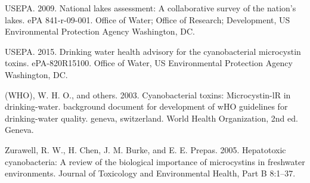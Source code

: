 \documentclass[11pt,]{article}
\begin{document}
USEPA. 2009. National lakes assessment: A collaborative survey of the
nation's lakes. ePA 841-r-09-001. Office of Water; Office of Research;
Development, US Environmental Protection Agency Washington, DC.

USEPA. 2015. Drinking water health advisory for the cyanobacterial
microcystin toxins. ePA-820R15100. Office of Water, US Environmental
Protection Agency Washington, DC.

(WHO), W. H. O., and others. 2003. Cyanobacterial toxins: Microcystin-lR
in drinking-water. background document for development of wHO guidelines
for drinking-water quality. geneva, switzerland. World Health
Organization, 2nd ed. Geneva.

Zurawell, R. W., H. Chen, J. M. Burke, and E. E. Prepas. 2005.
Hepatotoxic cyanobacteria: A review of the biological importance of
microcystins in freshwater environments. Journal of Toxicology and
Environmental Health, Part B 8:1--37.
\end{document}

